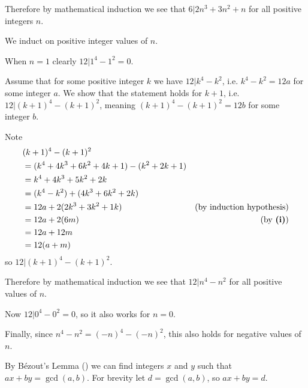 \begin{questions}
\begin{partquestions}{\roman*}
        Therefore by mathematical induction we see that $6 \vert 2n^3 + 3n^2 + n$ for all positive integers $n$.
        
        \item We induct on positive integer values of $n$.
    
        When $n = 1$ clearly $12 \vert 1^4 - 1^2 = 0$.

        Assume that for some positive integer $k$ we have $12 \vert k^4 - k^2$, i.e. $k^4 - k^2 = 12a$ for some integer $a$. We show that the statement holds for $k+1$, i.e. $12 \vert (k+1)^4 - (k+1)^2$, meaning $(k+1)^4 - (k+1)^2 = 12b$ for some integer $b$.

        Note
        \begin{align*}
            &(k+1)^4 - (k+1)^2\\
            &= (k^4 + 4k^3 + 6k^2 + 4k + 1) - (k^2 + 2k + 1)\\
            &= k^4 + 4k^3 + 5k^2 + 2k\\
            &= (k^4 - k^2) + (4k^3 + 6k^2 + 2k)\\
            &= 12a + 2(2k^3 + 3k^2 + 1k) & (\text{by induction hypothesis})\\
            &= 12a + 2(6m) & (\text{by \textbf{(i)}})\\
            &= 12a + 12m\\
            &= 12(a+m)
        \end{align*}
        so $12 \vert (k+1)^4 - (k+1)^2$.

        Therefore by mathematical induction we see that $12 \vert n^4 - n^2$ for all positive values of $n$.

        Now $12 \vert 0^4 - 0^2 = 0$, so it also works for $n = 0$.

        Finally, since $n^4 - n^2 = (-n)^4 - (-n)^2$, this also holds for negative values of $n$.
    \end{partquestions}
    
    \item \begin{partquestions}{\roman*}
        \item By B\'{e}zout's Lemma () we can find integers $x$ and $y$ such that $ax + by = \gcd(a, b)$. For brevity let $d = \gcd(a,b)$, so $ax+by=d$.
    

\end{partquestions}
\end{questions}
